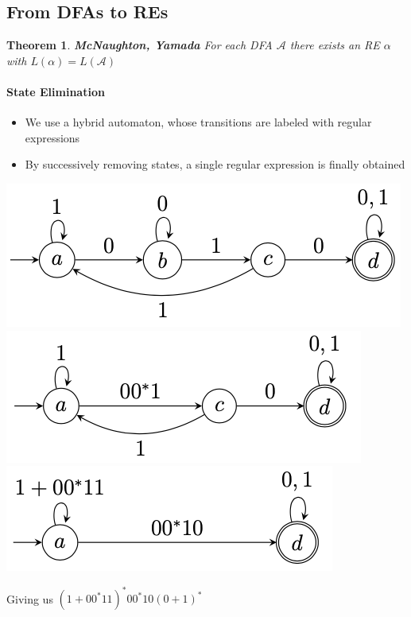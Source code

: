 \documentclass[a3paper, 8pt]{extarticle}
\newtheorem{theorem}{Theorem}[section]
\begin{document}
\begin{multicols*}{6}
\subsection{From DFAs to REs}

\begin{theorem}
    \textbf{McNaughton, Yamada} For each DFA $\mathcal{A}$ there exists an RE $\alpha$ with $L(\alpha) = L(\mathcal{A})$
\end{theorem}

\paragraph{State Elimination}
\begin{itemize}
    \item We use a hybrid automaton, whose transitions are labeled with regular expressions
    \item By successively removing states, a single regular expression is finally obtained
\end{itemize}

\begin{center}
\includegraphics[width= 0.67\columnwidth]{images/Screen Shot 2023-01-07 at 16.37.09.png}
\includegraphics[width= 0.67\columnwidth]{images/Screen Shot 2023-01-07 at 16.37.19.png}
\includegraphics[width= 0.67\columnwidth]{images/Screen Shot 2023-01-07 at 16.37.32.png}
\end{center}

Giving us $(1 + 00^*11)^*00^*10(0 + 1)^*$


\end{multicols*}
\end{document}
